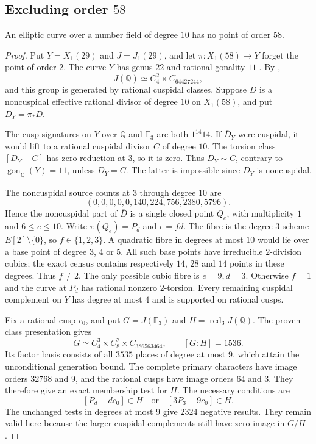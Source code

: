\subsection{Excluding order $58$}\label{sec:d31a58}
\begin{proposition}\label{prop:decic58-exclusion}
An elliptic curve over a number field of degree $10$ has no point of order $58$.
\end{proposition}
\begin{proof}
Put $Y=X_1(29)$ and $J=J_1(29)$, and let
$\pi:X_1(58)\longrightarrow Y$ forget the point of order $2$.
The curve $Y$ has genus $22$ and rational gonality $11$ \cite{DvH}.
By \cite[Theorems~3.1 and~4.13, Table~2]{DEHMZ},
\[
 J(\mathbb Q)\simeq C_4^2\times C_{64427244},
\]
and this group is generated by rational cuspidal classes.
Suppose $D$ is a noncuspidal effective rational divisor of degree $10$ on $X_1(58)$,
and put $D_Y=\pi_*D$.

The cusp signatures on $Y$ over $\mathbb Q$ and $\mathbb F_3$ are both
$1^{14}14$. If $\overline D_Y$ were cuspidal, it would lift to a
rational cuspidal divisor $C$ of degree $10$.
The torsion class $[D_Y-C]$ has zero reduction at $3$, so it is zero.
Thus $D_Y\sim C$, contrary to $\operatorname{gon}_{\mathbb Q}(Y)=11$,
unless $D_Y=C$. The latter is impossible since $D_Y$ is noncuspidal.

The noncuspidal source counts at $3$ through degree $10$ are
\[
 (0,0,0,0,0,140,224,756,2380,5796).
\]
Hence the noncuspidal part of $\overline D$ is a single closed point $Q_e$,
with multiplicity $1$ and $6\le e\le10$.
Write $\pi(Q_e)=P_d$ and $e=fd$.
The fibre is the degree-$3$ scheme $E[2]\setminus\{0\}$, so $f\in\{1,2,3\}$.
A quadratic fibre in degrees at most $10$ would lie over a base point of degree
$3$, $4$ or $5$.
All such base points have irreducible $2$-division cubics; the exact census
contains respectively $14$, $28$ and $14$ points in these degrees.
Thus $f\ne2$.
The only possible cubic fibre is $e=9,d=3$.
Otherwise $f=1$ and the curve at $P_d$ has rational nonzero $2$-torsion.
Every remaining cuspidal complement on $Y$ has degree at most $4$
and is supported on rational cusps.

Fix a rational cusp $c_0$, and put
$G=J(\mathbb F_3)$ and $H=\operatorname{red}_3J(\mathbb Q)$.
The proven class presentation gives
\[
 G\simeq C_4^3\times C_8^2\times C_{386563464},
 \qquad [G:H]=1536.
\]
Its factor basis consists of all $3535$ places of degree at most $9$,
which attain the unconditional generation bound.
The complete primary characters have image orders $32768$ and $9$,
and the rational cusps have image orders $64$ and $3$.
They therefore give an exact membership test for $H$.
The necessary conditions are
\[
 [P_d-dc_0]\in H\quad\text{or}\quad[3P_3-9c_0]\in H.
\]
The unchanged tests in degrees at most $9$ give $2324$ negative results.
They remain valid here because the larger cuspidal complements still
have zero image in $G/H$.


\end{proof}
